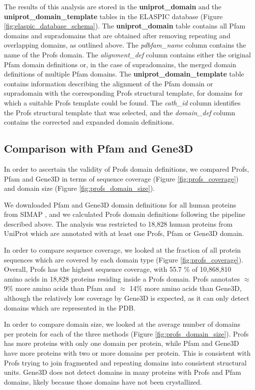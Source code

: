 The results of this analysis are stored in the \textbf{uniprot\_domain} and the \textbf{uniprot\_domain\_template} tables in the ELASPIC database (Figure \ref{fig:elaspic_database_schema}). The \textbf{uniprot\_domain} table contains all Pfam domains and supradomains that are obtained after removing repeating and overlapping domains, as outlined above. The \textit{pdbfam\_name} column contains the name of the Profs domain. The \textit{alignment\_def} column contains either the original Pfam domain definitions or, in the case of supradomains, the merged domain definitions of multiple Pfam domains. The \textbf{uniprot\_domain\_template} table contains information describing the alignment of the Pfam domain or supradomain with the corresponding Profs structural template, for domains for which a suitable Profs template could be found. The \textit{cath\_id} column identifies the Profs structural template that was selected, and the \textit{domain\_def} column contains the corrected and expanded domain definitions.


\subsection{Comparison with Pfam and Gene3D}

In order to ascertain the validity of Profs domain definitions, we compared Profs, Pfam and Gene3D in terms of sequence coverage (Figure \ref{fig:profs_coverage}) and domain size (Figure \ref{fig:profs_domain_size}).

We downloaded Pfam and Gene3D domain definitions for all human proteins from SIMAP \cite{rattei_simapcomprehensive_2010}, and we calculated Profs domain definitions following the pipeline described above. The analysis was restricted to 18,828 human proteins from UniProt which are annotated with at least one Profs, Pfam or Gene3D domain.

In order to compare sequence coverage, we looked at the fraction of all protein sequences which are covered by each domain type (Figure \ref{fig:profs_coverage}). Overall, Profs has the highest sequence coverage, with 55.7 \% of 10,868,810 amino acids in 18,828 proteins residing inside a Profs domain. Profs annotates $\approx$ 9\% more amino acids than Pfam and $\approx$ 14\% more amino acids than Gene3D, although the relatively low coverage by Gene3D is expected, as it can only detect domains which are represented in the PDB.

In order to compare domain size, we looked at the average number of domains per protein for each of the three methods (Figure \ref{fig:profs_domain_size}). Profs has more proteins with only one domain per protein, while Pfam and Gene3D have more proteins with two or more domains per protein. This is consistent with Profs trying to join fragmented and repeating domains into consistent structural units. Gene3D does not detect domains in many proteins with Profs and Pfam domains, likely because those domains have not been crystallized.

